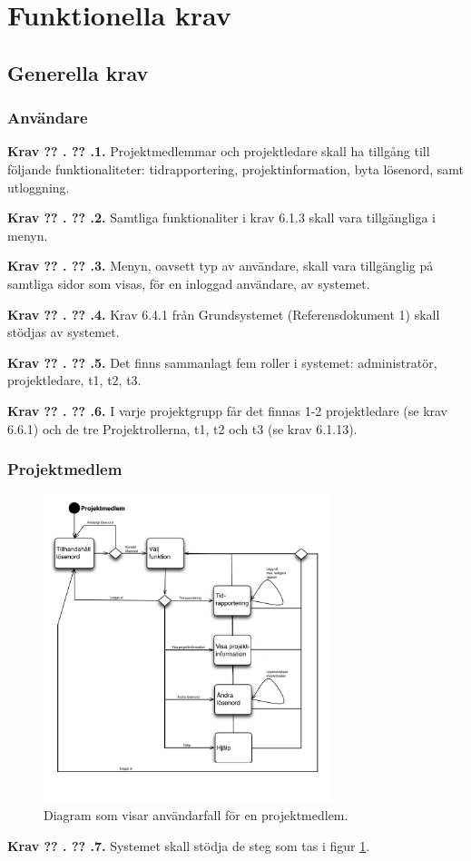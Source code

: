 \documentclass[a4paper]{article}
\newcommand\getcurrentref[1]{%
 \ifnumequal{\value{#1}}{0}
  {??}
  {\the\value{#1}}%
}
\newcommand\requirement[2]{
	\numberedrow{Krav}{#1}{#2}
}
\newcommand\numberedrow[3]{
	\noindent
	\textbf{#1 \getcurrentref{section}.\getcurrentref{subsection}.#2.} #3
	
}
\begin{document}

\section{Funktionella krav}
	\subsection{Generella krav}
		\label{krav-funk-gen}
		\subsubsection*{Användare}
		\requirement{1}{Projektmedlemmar och projektledare skall ha tillgång till följande funktionaliteter: tidrapportering, projektinformation, byta lösenord, samt utloggning.}
		
		\requirement{2}{Samtliga funktionaliter i krav 6.1.3 skall vara tillgängliga i menyn.}
		\requirement{3}{Menyn, oavsett typ av användare, skall vara tillgänglig på samtliga sidor som visas, för en inloggad användare, av systemet.}
		\requirement{4}{Krav 6.4.1 från Grundsystemet (Referensdokument 1) skall stödjas av systemet.}
		\requirement{5}{Det finns sammanlagt fem roller i systemet: administratör, projektledare, t1, t2, t3.}
		\requirement{6}{I varje projektgrupp får det finnas 1-2 projektledare (se krav 6.6.1) och de tre Projektrollerna, t1, t2 och t3 (se krav 6.1.13).}
		\subsubsection*{Projektmedlem}		
			\begin{figure}[h!]
				\centering
				\includegraphics[width=0.75\textwidth]{flow_common_proj_mem}
				\caption{Diagram som visar användarfall för en projektmedlem.}
				\label{image_gen_promed}
			\end{figure}
		\requirement{7}{Systemet skall stödja de steg som tas i figur \ref{image_gen_promed}.}
\end{document}
